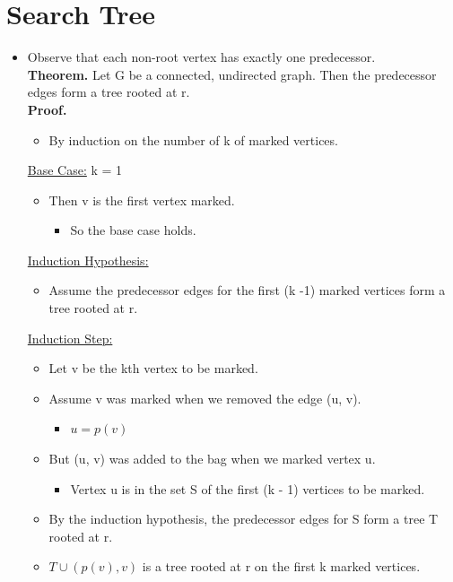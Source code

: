 \documentclass[12pt]{article}
\begin{document}
\section{Search Tree}
\renewcommand{\labelitemii}{$\circ$}
\renewcommand{\labelitemiii}{$\cdot$}
\renewcommand{\labelitemiii}{$\rightarrow$}
\renewcommand{\labelitemiv}{$\star$}
\begin{itemize}
\item Observe that each non-root vertex has exactly one predecessor.\\
 \textbf{Theorem.} Let G be a connected, undirected graph. Then the predecessor edges form a tree rooted at r.\\
 \textbf{Proof.}
	 \begin{itemize}
	\item By induction on the number of k of marked vertices.
	\end{itemize}
\underline{Base Case:} k = 1
	\begin{itemize}
	\item Then v is the first vertex marked.
		\begin{itemize}
		\item So the base case holds.
		\end{itemize}
	\end{itemize}
	
\underline{Induction Hypothesis:} 
	\begin{itemize}
	\item Assume the predecessor edges for the first (k -1) marked vertices form a tree rooted at r.
	\end{itemize}
	
\underline{Induction Step:} 
	\begin{itemize}
	\item Let v be the kth vertex to be marked.
	\item Assume v was marked when we removed the edge (u, v).
		\begin{itemize}
		\item $u = p(v)$
		\end{itemize}
	\item But (u, v) was added to the bag when we marked vertex u.
		\begin{itemize}
		\item Vertex u is in the set S of the first (k - 1) vertices to be marked.
		\end{itemize}
	\item By the induction hypothesis, the predecessor edges for S form a tree T rooted at r.
	\item $T \cup (p(v), v)$ is a tree rooted at r on the first k marked vertices.
	\end{itemize}
\end{itemize}
\end{document}
